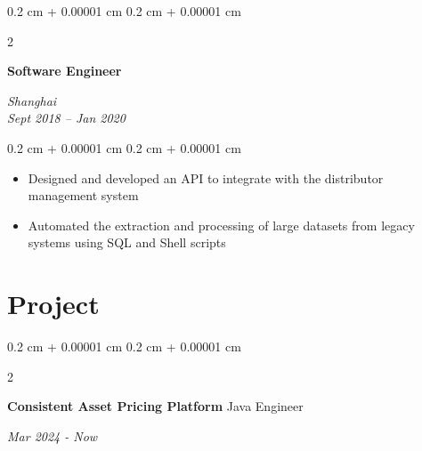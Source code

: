 \documentclass[10pt, letterpaper]{article}
\newenvironment{highlights}{
	\begin{itemize}[
		topsep=0.10 cm,
		parsep=0.10 cm,
		partopsep=0pt,
		itemsep=0pt,
		leftmargin=0.4 cm + 10pt
		]
	}{
	\end{itemize}
} %
\newenvironment{onecolentry}{
	\begin{adjustwidth}{
			0.2 cm + 0.00001 cm
		}{
			0.2 cm + 0.00001 cm
		}
	}{
	\end{adjustwidth}
} %
\newenvironment{twocolentry}[2][]{
	\onecolentry
	\def\secondColumn{#2}
	\setcolumnwidth{\fill, 4.5 cm}
	\begin{paracol}{2}
	}{
		\switchcolumn \raggedleft \secondColumn
	\end{paracol}
	\endonecolentry
} %
\begin{document}
	
	\vspace{0.2 cm}

	\vspace{0.2 cm}	
	
	\begin{twocolentry}{
		\textit{Shanghai}\\
		\textit{Sept 2018 – Jan 2020}}
		\textbf{Software Engineer}
		\\
	\end{twocolentry}
	
	\vspace{0.08 cm}
	\begin{onecolentry}
		\begin{highlights}
			\item Designed and developed an API to integrate with the distributor management system
			\item Automated the extraction and processing of large datasets from legacy systems using SQL and Shell scripts
		\end{highlights}
	\end{onecolentry}
	
	
	
	

	
	\section{Project}
	\vspace{0.1 cm}
	
	
	\begin{twocolentry}{
			\textit{Mar 2024 - Now}}
			\textbf{Consistent Asset Pricing Platform} 
			\space\space\space\space\space\space\space\space\space\space\space\space Java Engineer
		\end{twocolentry}
		
\end{document}
